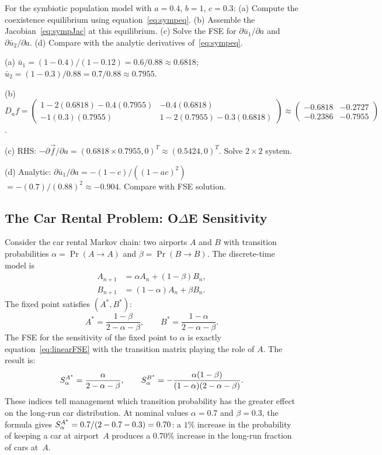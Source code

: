 \begin{selfcheck}
For the symbiotic population model with $a = 0.4$, $b = 1$, $c = 0.3$:
(a) Compute the coexistence equilibrium using equation~\eqref{eq:sympeq}.
(b) Assemble the Jacobian~\eqref{eq:sympJac} at this equilibrium.
(c) Solve the FSE for $\partial\bar{u}_1/\partial a$ and
    $\partial\bar{u}_2/\partial a$.
(d) Compare with the analytic derivatives of~\eqref{eq:sympeq}.
\end{selfcheck}
\begin{scAnswer}
(a) $\bar{u}_1 = (1-0.4)/(1-0.12) = 0.6/0.88 \approx 0.6818$;
$\bar{u}_2 = (1-0.3)/0.88 = 0.7/0.88 \approx 0.7955$.

(b) $D_u f = \begin{pmatrix} 1-2(0.6818)-0.4(0.7955) & -0.4(0.6818) \\
-1(0.3)(0.7955) & 1-2(0.7955)-0.3(0.6818)\end{pmatrix}
\approx \begin{pmatrix} -0.6818 & -0.2727 \\ -0.2386 & -0.7955 \end{pmatrix}$.

(c) RHS: $-\partial\vec{f}/\partial a = (0.6818\times0.7955, 0)^T \approx (0.5424, 0)^T$.
Solve $2\times2$ system.

(d) Analytic: $\partial\bar{u}_1/\partial a = -(1-c)/((1-ac)^2)$
$= -(0.7)/(0.88)^2 \approx -0.904$. Compare with FSE solution.
\end{scAnswer}

\subsection{The Car Rental Problem: O$\Delta$E Sensitivity}

Consider the car rental Markov chain: two airports $A$ and $B$ with
transition probabilities $\alpha = \Pr(A\to A)$ and $\beta = \Pr(B\to B)$.
The discrete-time model is
\begin{align}
  A_{n+1} &= \alpha A_n + (1-\beta)B_n, \label{eq:carA}\\
  B_{n+1} &= (1-\alpha)A_n + \beta B_n. \label{eq:carB}
\end{align}
The fixed point satisfies $(A^*, B^*)$:
\[
  A^* = \frac{1-\beta}{2-\alpha-\beta}, \qquad
  B^* = \frac{1-\alpha}{2-\alpha-\beta}.
\]
The FSE for the sensitivity of the fixed point to $\alpha$ is
exactly equation~\eqref{eq:linearFSE} with the transition matrix
playing the role of $A$. The result is:
\begin{equation}
  S_{\alpha}^{A^*} = \frac{\alpha}{2-\alpha-\beta},
  \qquad
  S_{\alpha}^{B^*} = -\frac{\alpha(1-\beta)}{(1-\alpha)(2-\alpha-\beta)}.
  \label{eq:carSI}
\end{equation}
These indices tell management which transition probability has the
greater effect on the long-run car distribution.
At nominal values $\alpha = 0.7$ and $\beta = 0.3$, the formula gives
$S_{\alpha}^{A^*} = 0.7/(2-0.7-0.3) = 0.70$: a $1\%$ increase in the
probability of keeping a car at airport~$A$ produces a $0.70\%$ increase
in the long-run fraction of cars at~$A$.

